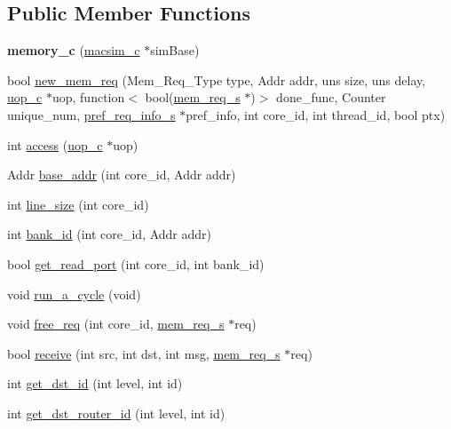 \subsection*{Public Member Functions}
\begin{DoxyCompactItemize}
\item 
\hypertarget{classmemory__c_aa642409499551fb2be1e9c1073f1ae58}{
{\bfseries memory\_\-c} (\hyperlink{classmacsim__c}{macsim\_\-c} $\ast$simBase)}
\label{classmemory__c_aa642409499551fb2be1e9c1073f1ae58}

\item 
bool \hyperlink{classmemory__c_ae7d66a0d0b90fd734cd568e238d626ea}{new\_\-mem\_\-req} (Mem\_\-Req\_\-Type type, Addr addr, uns size, uns delay, \hyperlink{classuop__c}{uop\_\-c} $\ast$uop, function$<$ bool(\hyperlink{structmem__req__s}{mem\_\-req\_\-s} $\ast$)$>$ done\_\-func, Counter unique\_\-num, \hyperlink{structpref__req__info__s}{pref\_\-req\_\-info\_\-s} $\ast$pref\_\-info, int core\_\-id, int thread\_\-id, bool ptx)
\item 
int \hyperlink{classmemory__c_ae4385c1817139c78c385339de8a90454}{access} (\hyperlink{classuop__c}{uop\_\-c} $\ast$uop)
\item 
Addr \hyperlink{classmemory__c_aca226079ad178cfcd5724d8b24ec937f}{base\_\-addr} (int core\_\-id, Addr addr)
\item 
int \hyperlink{classmemory__c_a70e1ed0c249016cfab45bfa2ce9a02a7}{line\_\-size} (int core\_\-id)
\item 
int \hyperlink{classmemory__c_afd93c2187e5879151868b3910dbfd99b}{bank\_\-id} (int core\_\-id, Addr addr)
\item 
bool \hyperlink{classmemory__c_a4b10208dda24728f314aa841107c8149}{get\_\-read\_\-port} (int core\_\-id, int bank\_\-id)
\item 
void \hyperlink{classmemory__c_a8663ad14c52686bcb441a55a8bcedc9a}{run\_\-a\_\-cycle} (void)
\item 
void \hyperlink{classmemory__c_a5bca39b03fc329e94230dc84b5649807}{free\_\-req} (int core\_\-id, \hyperlink{structmem__req__s}{mem\_\-req\_\-s} $\ast$req)
\item 
bool \hyperlink{classmemory__c_a64e019e7a18841fa0bb4136c1ce2f7cb}{receive} (int src, int dst, int msg, \hyperlink{structmem__req__s}{mem\_\-req\_\-s} $\ast$req)
\item 
int \hyperlink{classmemory__c_a2c7648ced944361742f1599c30a88e9a}{get\_\-dst\_\-id} (int level, int id)
\item 
int \hyperlink{classmemory__c_af80eff0db7549c4d1f267c608feb65ca}{get\_\-dst\_\-router\_\-id} (int level, int id)

\end{DoxyCompactItemize}

